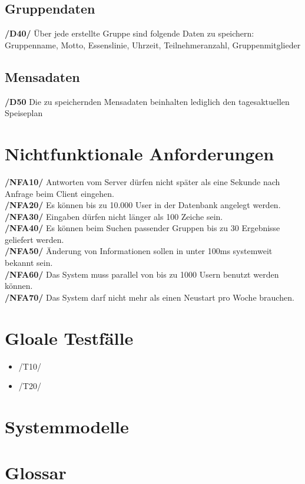 \documentclass[a4paper]{scrreprt}
\begin{document}
\section{Gruppendaten}

\begin{addmargin}[25pt]{0pt}
\textbf{/D40/} Über jede erstellte Gruppe sind folgende Daten zu speichern:\\
Gruppenname, Motto, Essenslinie, Uhrzeit, Teilnehmeranzahl, Gruppenmitglieder\\
\end{addmargin}

\section{Mensadaten}

\begin{addmargin}[25pt]{0pt}
\textbf{/D50} Die zu speichernden Mensadaten beinhalten lediglich den tagesaktuellen Speiseplan\\
\end{addmargin}



\chapter{Nichtfunktionale Anforderungen}

\begin{addmargin}[25pt]{0pt} 
\textbf{/NFA10/} Antworten vom Server dürfen nicht später als eine Sekunde nach Anfrage beim Client eingehen.\\
\textbf{/NFA20/} Es können bis zu 10.000 User in der Datenbank angelegt werden.\\
\textbf{/NFA30/} Eingaben dürfen nicht länger als 100 Zeiche sein.\\
\textbf{/NFA40/} Es können beim Suchen passender Gruppen bis zu 30 Ergebnisse geliefert werden.\\
\textbf{/NFA50/} Änderung von Informationen sollen in unter 100ms systemweit bekannt sein.\\
\textbf{/NFA60/} Das System muss parallel von bis zu 1000 Usern benutzt werden können.\\
\textbf{/NFA70/} Das System darf nicht mehr als einen Neustart pro Woche brauchen.\\
\end{addmargin}


\chapter{Gloale Testfälle}
\begin{itemize}
\item /T10/ 
\item /T20/

\end{itemize}

\chapter{Systemmodelle}

\chapter{Glossar}
 

 
\end{document}
